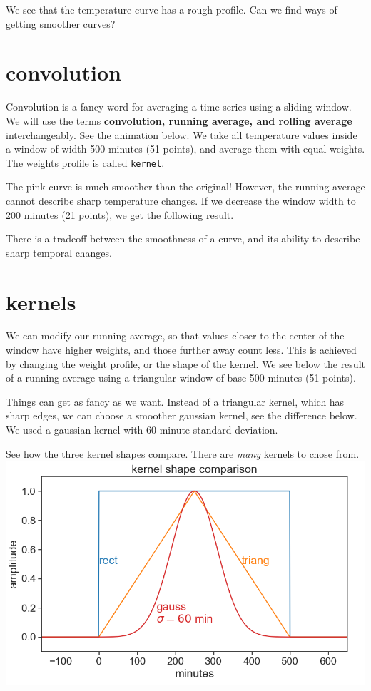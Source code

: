 \documentclass[
  letterpaper,
  DIV=11,
  numbers=noendperiod,
  oneside]{scrreprt}
\begin{document}
We see that the temperature curve has a rough profile. Can we find ways
of getting smoother curves?

\hypertarget{convolution}{%
\section{convolution}\label{convolution}}

Convolution is a fancy word for averaging a time series using a sliding
window. We will use the terms \textbf{convolution, running average, and
rolling average} interchangeably. See the animation below. We take all
temperature values inside a window of width 500 minutes (51 points), and
average them with equal weights. The weights profile is called
\texttt{kernel}.

The pink curve is much smoother than the original! However, the running
average cannot describe sharp temperature changes. If we decrease the
window width to 200 minutes (21 points), we get the following result.

There is a tradeoff between the smoothness of a curve, and its ability
to describe sharp temporal changes.

\hypertarget{kernels}{%
\section{kernels}\label{kernels}}

We can modify our running average, so that values closer to the center
of the window have higher weights, and those further away count less.
This is achieved by changing the weight profile, or the shape of the
kernel. We see below the result of a running average using a triangular
window of base 500 minutes (51 points).

Things can get as fancy as we want. Instead of a triangular kernel,
which has sharp edges, we can choose a smoother gaussian kernel, see the
difference below. We used a gaussian kernel with 60-minute standard
deviation.

See how the three kernel shapes compare. There are
\href{https://docs.scipy.org/doc/scipy/reference/signal.windows.html\#module-scipy.signal.windows}{\emph{many}
kernels to chose from}. \includegraphics{smoothing/kernel_shapes.png}
\end{document}
